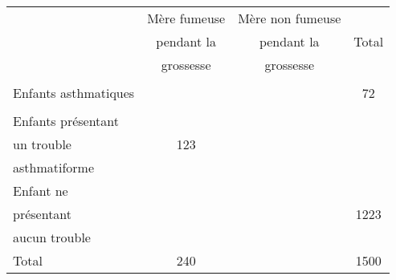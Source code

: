 \begin{tabular}{|@{\ }l@{\ }|@{\ }c@{\ }|@{\ }c@{\ }|@{\ \ \ \ \ }c@{\ \ \ \ \ }|}
	\hline
                     & Mère fumeuse & Mère non fumeuse &  \\
                     & pendant la                       & pendant la                           & Total                \\
                     & grossesse                        & grossesse                            &                      \\
	\hline
	& & &\\
Enfants asthmatiques &                                  &                                      & 72                   \\
	& & &\\
	\hline
Enfants présentant   &                                  &                                      &                      \\
un trouble           & 123                              &                                      &                      \\
asthmatiforme        &                                  &                                      &                      \\
	\hline
Enfant ne            &                                  &                                      &                      \\
présentant           &                                  &                                      & 1223                 \\
aucun trouble        &                                  &                                      &                      \\
	\hline
Total                & 240                              &                                      & 1500                \\
	\hline
\end{tabular}